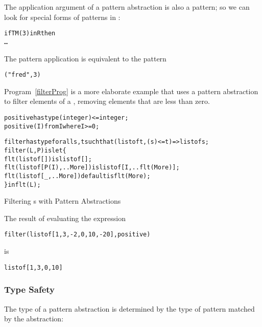 The application argument of a pattern abstraction is also a pattern; so we can look for special forms of  patterns in :
\begin{alltt}
if TM(3) in R then
  \ldots
\end{alltt}
The pattern application  is equivalent to the pattern 
\begin{alltt}
("fred",3)
\end{alltt}
Program~\vref{filterProg} is a more elaborate example that uses a pattern abstraction to filter elements of a , removing elements that are less than zero.
\begin{program}
\begin{alltt}
positive has type (integer) <= integer;
positive(I) from I where I>=0;
  
filter has type for all s,t such that (list of t, (s)<=t) => list of s;
filter(L,P) is let\{
  flt(list of []) is list of [];
  flt(list of [P(I),..More]) is list of [I,..flt(More)];
  flt(list of [_,..More]) default is flt(More);
\} in flt(L);
\end{alltt}
\caption{Filtering s with Pattern Abstractions\label{filterProg}}
\end{program}
The result of evaluating the expression
\begin{alltt}
filter(list of [1,3,-2,0,10,-20],positive)
\end{alltt}
is
\begin{alltt}
list of [1,3,0,10]
\end{alltt}

\subsubsection{Type Safety}
The type of a pattern abstraction is determined by the type of pattern matched by the abstraction:
\begin{prooftree}
\end{prooftree}

